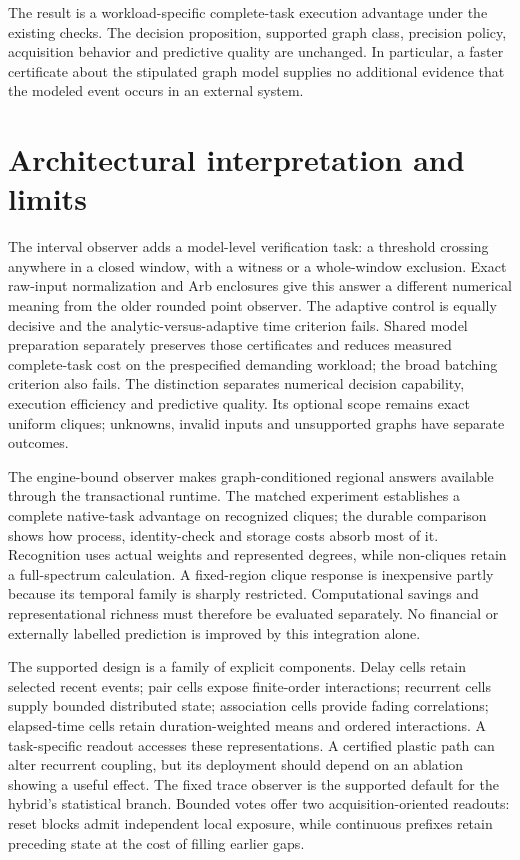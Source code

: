 \documentclass[11pt,a4paper]{article}
\theoremstyle{definition}\newtheorem{definition}[theorem]{Definition}
\begin{document}
The result is a workload-specific complete-task execution advantage under the existing checks. The decision proposition, supported graph class, precision policy, acquisition behavior and predictive quality are unchanged. In particular, a faster certificate about the stipulated graph model supplies no additional evidence that the modeled event occurs in an external system.

\section{Architectural interpretation and limits}
The interval observer adds a model-level verification task: a threshold crossing anywhere in a closed window, with a witness or a whole-window exclusion. Exact raw-input normalization and Arb enclosures give this answer a different numerical meaning from the older rounded point observer. The adaptive control is equally decisive and the analytic-versus-adaptive time criterion fails. Shared model preparation separately preserves those certificates and reduces measured complete-task cost on the prespecified demanding workload; the broad batching criterion also fails. The distinction separates numerical decision capability, execution efficiency and predictive quality. Its optional scope remains exact uniform cliques; unknowns, invalid inputs and unsupported graphs have separate outcomes.

The engine-bound observer makes graph-conditioned regional answers available through the transactional runtime. The matched experiment establishes a complete native-task advantage on recognized cliques; the durable comparison shows how process, identity-check and storage costs absorb most of it. Recognition uses actual weights and represented degrees, while non-cliques retain a full-spectrum calculation. A fixed-region clique response is inexpensive partly because its temporal family is sharply restricted. Computational savings and representational richness must therefore be evaluated separately. No financial or externally labelled prediction is improved by this integration alone.

The supported design is a family of explicit components. Delay cells retain selected recent events; pair cells expose finite-order interactions; recurrent cells supply bounded distributed state; association cells provide fading correlations; elapsed-time cells retain duration-weighted means and ordered interactions. A task-specific readout accesses these representations. A certified plastic path can alter recurrent coupling, but its deployment should depend on an ablation showing a useful effect. The fixed trace observer is the supported default for the hybrid's statistical branch. Bounded votes offer two acquisition-oriented readouts: reset blocks admit independent local exposure, while continuous prefixes retain preceding state at the cost of filling earlier gaps.
\end{document}
